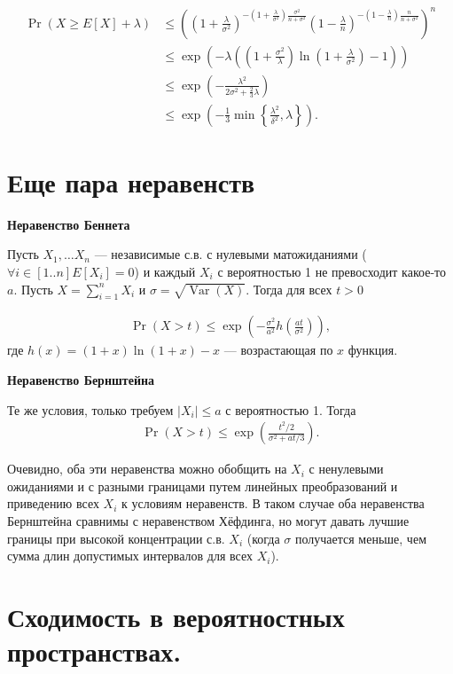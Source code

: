 \documentclass[12pt]{article}
\DeclareMathOperator{\Var}{Var}
\begin{document}
\begin{align*}
  \Pr(X \ge E[X] + \lambda) &\le \left(\left(1 + \frac{\lambda}{\sigma^2}\right)^{-(1 + \frac{\lambda}{\sigma^2})\frac{\sigma^2}{n + \sigma^2}} \left(1 - \frac{\lambda}{n}\right)^{-(1 - \frac{\lambda}{n})\frac{n}{n + \sigma^2}} \right)^n \\
  &\le \exp\left(-\lambda\left(\left(1 + \frac{\sigma^2}{\lambda}\right)\ln\left(1 + \frac{\lambda}{\sigma^2}\right) - 1\right)\right) \\
  &\le \exp\left(-\frac{\lambda^2}{2\sigma^2 + \frac{2}{3}\lambda}\right) \\
  &\le \exp\left(-\frac{1}{3} \min\left\{ \frac{\lambda^2}{\delta^2}, \lambda\right\}\right).
\end{align*}

\section{Еще пара неравенств}

\textbf{Неравенство Беннета}

Пусть $X_1, \dots X_n$ --- независимые с.в. с нулевыми матожиданиями ($\forall i\in[1..n] E[X_i] = 0$) и каждый $X_i$ с вероятностью 1 не превосходит какое-то $a$. Пусть $X = \sum_{i = 1}^n X_i$ и $\sigma = \sqrt{\Var(X)}$. Тогда для всех $t > 0$

\begin{align*}
  \Pr(X > t) \le \exp\left(-\frac{\sigma^2}{a^2} h\left(\frac{at}{\sigma^2}\right)\right),
\end{align*}
где $h(x) = (1 + x)\ln(1 + x) - x$ --- возрастающая по $x$ функция.

\textbf{Неравенство Бернштейна}

Те же условия, только требуем $|X_i| \le a$ с вероятностью 1. Тогда 
\begin{align*}
  \Pr(X > t) \le \exp\left(\frac{t^2 / 2}{\sigma^2 + at/3}\right).
\end{align*}

Очевидно, оба эти неравенства можно обобщить на $X_i$ с ненулевыми ожиданиями и с разными границами путем линейных преобразований и приведению всех $X_i$ к условиям неравенств. В таком случае оба неравенства Бернштейна сравнимы с неравенством Хёфдинга, но могут давать лучшие границы при высокой концентрации с.в. $X_i$ (когда $\sigma$ получается меньше, чем сумма длин допустимых интервалов для всех $X_i$).

\section{Сходимость в вероятностных пространствах.}
\end{document}
